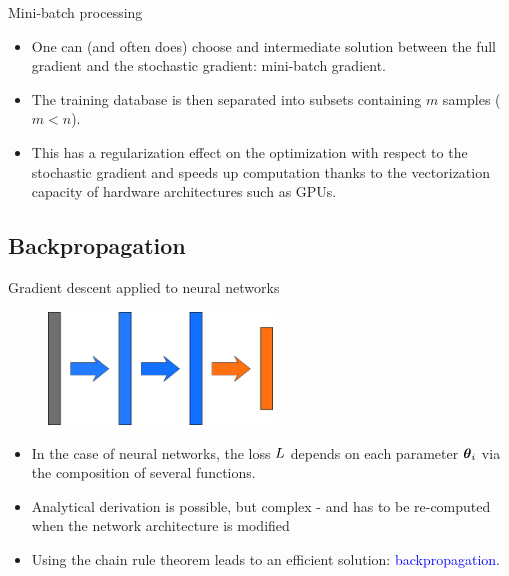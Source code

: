 \documentclass[xcolor=pdftex,dvipsnames,table,mathserif]{beamer}
\begin{document}
\begin{frame}{Mini-batch processing}

  \begin{itemize}[<+->]
  \item One can (and often does) choose and intermediate solution between the full gradient and the stochastic gradient: mini-batch gradient.
    \item   The training database is then separated into subsets containing $m$ samples ($m < n$).
    \item This has a regularization effect on the optimization with respect to the stochastic gradient and speeds up computation thanks to the vectorization capacity of hardware architectures such as GPUs.
  \end{itemize}

\end{frame}

\subsection{Backpropagation}


\begin{frame}{Gradient descent applied to neural networks}

      \begin{figure}
        \includegraphics[height=3cm]{nn_representation3}
      \end{figure}

 \begin{itemize}
  \item In the case of neural networks, the loss $L$ depends on each parameter $\boldsymbol{\theta}_i$ via the composition of several functions.
  \item Analytical derivation is possible, but complex - and has to be re-computed when the network architecture is modified
  \item Using the chain rule theorem leads to an efficient solution: \textcolor{blue}{backpropagation}.
\end{itemize}


\end{frame}
\end{document}
